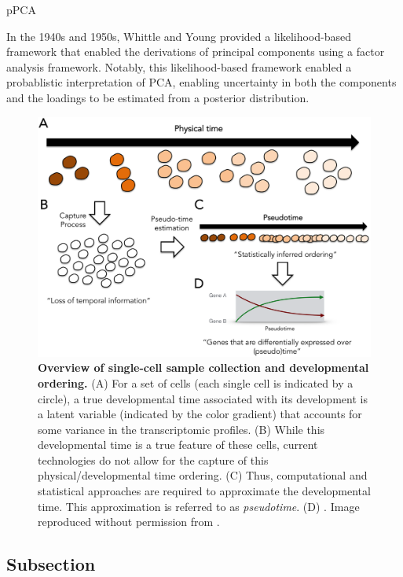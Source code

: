\documentclass[english, 11pt]{article}\usepackage[]{graphicx}\usepackage[]{color}
\begin{document}
pPCA \cite{tipping1999probabilistic}

In the 1940s and 1950s, Whittle\cite{whittle1952principal} and Young \cite{young1941maximum} provided a likelihood-based framework that enabled the derivations of principal components using a factor analysis framework. Notably, this likelihood-based framework enabled a probablistic interpretation of PCA, enabling uncertainty in both the components and the loadings to be estimated from a posterior distribution. 

\begin{figure}[H]
\begin{center}
\includegraphics[scale=1.0]{images/fig1campbell.png}
\end{center}
\caption{\textbf{Overview of single-cell sample collection and developmental ordering.} (A) For a set of cells (each single cell is indicated by a circle), a true developmental time associated with its development is a latent variable (indicated by the color gradient) that accounts for some variance in the transcriptomic profiles. (B) While this developmental time is a true feature of these cells, current technologies do not allow for the capture of this physical/developmental time ordering. (C) Thus, computational and statistical approaches are required to approximate the developmental time. This approximation is referred to as \textit{pseudotime}. (D) . Image reproduced without permission from \cite{campbell2016order}. }
\end{figure}


\subsection{Subsection }
\end{document}
